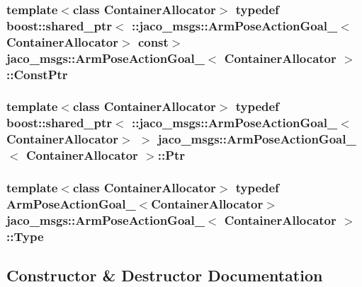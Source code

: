 \subsubsection[{\texorpdfstring{Const\+Ptr}{ConstPtr}}]{\setlength{\rightskip}{0pt plus 5cm}template$<$class Container\+Allocator$>$ typedef boost\+::shared\+\_\+ptr$<$ \+::{\bf jaco\+\_\+msgs\+::\+Arm\+Pose\+Action\+Goal\+\_\+}$<$Container\+Allocator$>$ const$>$ {\bf jaco\+\_\+msgs\+::\+Arm\+Pose\+Action\+Goal\+\_\+}$<$ Container\+Allocator $>$\+::{\bf Const\+Ptr}}\hypertarget{structjaco__msgs_1_1ArmPoseActionGoal___aeb4d228097324458156ee887c02b2103}{}\label{structjaco__msgs_1_1ArmPoseActionGoal___aeb4d228097324458156ee887c02b2103}
\subsubsection[{\texorpdfstring{Ptr}{Ptr}}]{\setlength{\rightskip}{0pt plus 5cm}template$<$class Container\+Allocator$>$ typedef boost\+::shared\+\_\+ptr$<$ \+::{\bf jaco\+\_\+msgs\+::\+Arm\+Pose\+Action\+Goal\+\_\+}$<$Container\+Allocator$>$ $>$ {\bf jaco\+\_\+msgs\+::\+Arm\+Pose\+Action\+Goal\+\_\+}$<$ Container\+Allocator $>$\+::{\bf Ptr}}\hypertarget{structjaco__msgs_1_1ArmPoseActionGoal___a61803adc8de377886afdf0be69ef204d}{}\label{structjaco__msgs_1_1ArmPoseActionGoal___a61803adc8de377886afdf0be69ef204d}
\subsubsection[{\texorpdfstring{Type}{Type}}]{\setlength{\rightskip}{0pt plus 5cm}template$<$class Container\+Allocator$>$ typedef {\bf Arm\+Pose\+Action\+Goal\+\_\+}$<$Container\+Allocator$>$ {\bf jaco\+\_\+msgs\+::\+Arm\+Pose\+Action\+Goal\+\_\+}$<$ Container\+Allocator $>$\+::{\bf Type}}\hypertarget{structjaco__msgs_1_1ArmPoseActionGoal___a9e089e364323cc5d5e1ede2fc5648adb}{}\label{structjaco__msgs_1_1ArmPoseActionGoal___a9e089e364323cc5d5e1ede2fc5648adb}


\subsection{Constructor \& Destructor Documentation}
